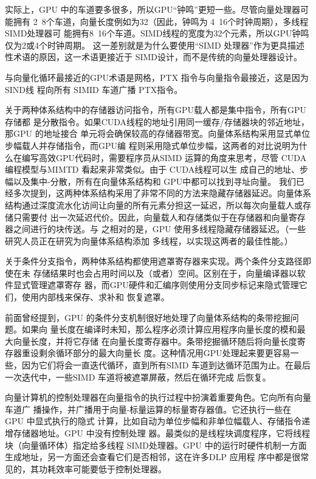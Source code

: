 实际上，GPU 中的车道要多很多，所以GPU“钟鸣”更短一些。尽管向量处理器可能拥有
2~8个车道，向量长度例如为32（因此，钟鸣为 4~16个时钟周期），多线程SIMD处理器可
能拥有8~16个车道。SIMD线程的宽度为32个元素，所以GPU钟鸣仅为2或4个时钟周期。
这一差别就是为什么要使用“SIMD 处理器”作为更具描述性术语的原因，这一术语更接近于
SIMD设计，而不是传统的向量处理器设计。

与向量化循环最接近的GPU术语是网格，PTX 指令与向量指令最接近，这是因为SIND线
程向所有 SIMID 车道广播 PTX指令。

关于两种体系结构中的存储器访问指令，所有GPU载人都是集中指令，所有GPU 存储都
是分散指令。如果CUDA线程的地址引用同一缓存/存储器块的邻近地址，那GPU 的地址接合
单元将会确保较高的存储器带宽。向量体系结构采用显式单位步幅载人并存储指令，而GPU编
程则采用隐式单位步幅，这两者的对比说明为什么在编写高效GPU代码时，需要程序员从SIMD
运算的角度来思考，尽管 CUDA编程模型与MIMTD 看起来非常类似。由于 CUDA线程可以生
成自己的地址、步幅以及集中-分散，所有在向量体系结构和 GPU中都可以找到寻址向量。
我们已经多次提到，这两种体系结构采用了非常不同的方法来隐藏存储器延迟。向量体系
结构通过深度流水化访间让向量的所有元素分担这一延迟，所以每次向量载人或存储只需要付
出一次延迟代价。因此，向量载人和存储类似于在存储器和向量寄存器之间进行的块传送。与
之相对的是，GPU 使用多线程隐藏存储器延迟。（一些研究人员正在研究为向量体系结构添加
多线程，以实现这两者的最佳性能。）

关于条件分支指令，两种体系结构都使用遮罩寄存器来实现。两个条件分支路径即使在未
存储结果时也会占用时间以及（或者）空间。区别在于，向量编译器以软件显式管理遮罩寄存
器，而GPU硬件和汇编序则使用分支同步标记来隐式管理它们，使用内部栈来保存、求补和
恢复遮罩。

前面曾经提到，GPU 的条件分支机制很好地处理了向量体系结构的条带挖掘问题。如果向
量长度在编译时未知，那么程序必须计算应用程序向量长度的模和最大向量长度，并将它存储
在向量长度寄存器中。条带挖掘循环随后将向量长度寄存器重设剩余循环部分的最大向量长
度。这种情况用GPU处理起来要更容易一些，因为它们将会一直迭代循环，直到所有SIMD
车道到达循环范围为止。在最后一次迭代中，一些SIMD 车道将被遮罩屏蔽，然后在循环完成
后恢复。

向量计算机的控制处理器在向量指令的执行过程中扮演着重要角色。它向所有向量车道广
播操作，并广播用于向量-标量运算的标量寄存器值。它还执行一些在 GPU 中显式执行的隐式
计算，比如自动为单位步幅和非单位幅载人、存储指令递增存储器地址。GPU 中没有控制处理
器。最类似的是线程块调度程序，它将线程块（向量循环体）指定给多线程 SIMD处理器。GPU
中的运行时硬件机制一方面生成地址，另一方面还会查看它们是否相邻，这在许多DLP 应用程
序中都是很常见的，其功耗效率可能要低于控制处理器。

